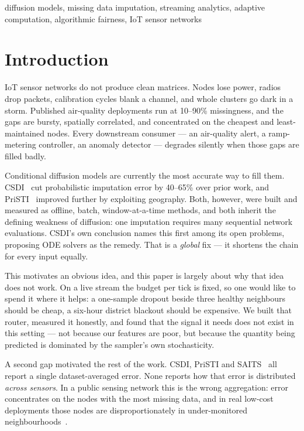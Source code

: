 \documentclass[conference]{IEEEtran}
\begin{document}
\begin{IEEEkeywords}
diffusion models, missing data imputation, streaming analytics, adaptive
computation, algorithmic fairness, IoT sensor networks
\end{IEEEkeywords}

\section{Introduction}

IoT sensor networks do not produce clean matrices. Nodes lose power, radios drop
packets, calibration cycles blank a channel, and whole clusters go dark in a
storm. Published air-quality deployments run at 10--90\% missingness, and the
gaps are bursty, spatially correlated, and concentrated on the cheapest and
least-maintained nodes. Every downstream consumer --- an air-quality alert, a
ramp-metering controller, an anomaly detector --- degrades silently when those
gaps are filled badly.

Conditional diffusion models are currently the most accurate way to fill them.
CSDI~\cite{csdi} cut probabilistic imputation error by 40--65\% over prior work,
and PriSTI~\cite{pristi} improved further by exploiting geography. Both,
however, were built and measured as offline, batch, window-at-a-time methods,
and both inherit the defining weakness of diffusion: one imputation requires
many sequential network evaluations. CSDI's own conclusion names this first
among its open problems, proposing ODE solvers as the remedy. That is a
\emph{global} fix --- it shortens the chain for every input equally.

This motivates an obvious idea, and this paper is largely about why that idea
does not work. On a live stream the budget per tick is fixed, so one would like
to spend it where it helps: a one-sample dropout beside three healthy
neighbours should be cheap, a six-hour district blackout should be expensive.
We built that router, measured it honestly, and found that the signal it needs
does not exist in this setting --- not because our features are poor, but
because the quantity being predicted is dominated by the sampler's own
stochasticity.

A second gap motivated the rest of the work. CSDI, PriSTI and SAITS~\cite{saits}
all report a single dataset-averaged error. None reports how that error is
distributed \emph{across sensors}. In a public sensing network this is the wrong
aggregation: error concentrates on the nodes with the most missing data, and in
real low-cost deployments those nodes are disproportionately in under-monitored
neighbourhoods~\cite{equity}.
\end{document}
